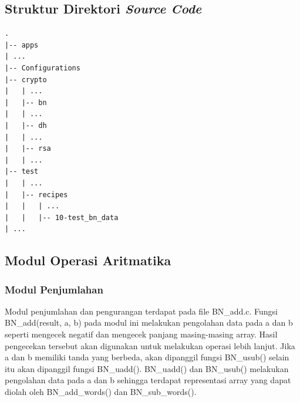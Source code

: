 %
%
%
%
%


\subsection{Struktur Direktori \textit{Source Code}}

\begin{lstlisting}[style=code]
.
|-- apps
| ...
|-- Configurations
|-- crypto
|   | ...
|   |-- bn
|   | ...
|   |-- dh
|   | ...
|   |-- rsa
|   | ...
|-- test
|   | ...
|   |-- recipes
|   |   | ...
|   |   |-- 10-test_bn_data
| ...

\end{lstlisting}

\subsection{Modul Operasi Aritmatika}
\subsubsection{Modul Penjumlahan}
Modul penjumlahan dan pengurangan terdapat pada file BN\_add.c. Fungsi BN\_add(result, a, b) pada modul ini melakukan pengolahan data pada a dan b seperti mengecek negatif dan mengecek panjang masing-masing array. Hasil pengecekan tersebut akan digunakan untuk melakukan operasi lebih lanjut. Jika a dan b memiliki tanda yang berbeda, akan dipanggil fungsi BN\_usub() selain itu akan dipanggil fungsi BN\_uadd(). BN\_uadd() dan BN\_usub() melakukan pengolahan data pada a dan b sehingga terdapat representasi array yang dapat diolah oleh BN\_add\_words() dan BN\_sub\_words().

